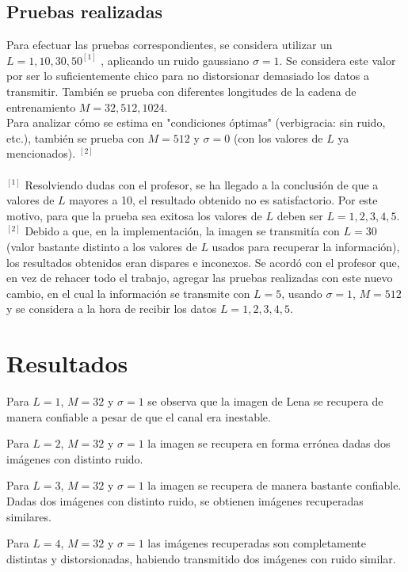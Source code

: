 \documentclass[10pt,journal,compsoc]{IEEEtran}
\begin{document}
\subsection{Pruebas realizadas}
Para efectuar las pruebas correspondientes, se considera utilizar un $L={1,10,30,50}^{[1]}$ , aplicando un ruido gaussiano $\sigma=1$. Se considera este valor por ser lo suficientemente chico para no distorsionar demasiado los datos a transmitir. Tambi\'en se prueba con diferentes longitudes de la cadena de entrenamiento $M={32,512,1024}$. \\  Para analizar c\'omo se estima en "condiciones \'optimas" (verbigracia: sin ruido, etc.), tambi\'en se prueba con $M=512$ y $\sigma=0$ (con los valores de $L$ ya mencionados). $^{[2]}$\\
\\
$^{[1]}$ Resolviendo dudas con el profesor, se ha llegado a la conclusi\'on de que a valores de $L$ mayores a 10, el resultado obtenido no es satisfactorio. Por este motivo, para que la prueba sea exitosa los valores de $L$ deben ser $L={1, 2, 3, 4, 5}$.\\
$^{[2]}$ Debido a que, en la implementaci\'on, la imagen se transmit\'ia con $L=30$ (valor bastante distinto a los valores de $L$ usados para recuperar la informaci\'on), los resultados obtenidos eran dispares e inconexos. Se acord\'o con el profesor que, en vez de rehacer todo el trabajo, agregar las pruebas realizadas con este nuevo cambio, en el cual la informaci\'on se transmite con $L=5$, usando $\sigma=1$, $M=512$ y se considera a la hora de recibir los datos $L={1, 2, 3, 4, 5}$. \\

\section{Resultados}

Para $L = {1}$, $M = {32}$ y $\sigma = 1$ se observa que la imagen de Lena se recupera de manera confiable a pesar de que el canal era inestable.


Para $L = {2}$, $M = {32}$ y $\sigma = 1$ la imagen se recupera en forma err\'onea dadas dos im\'agenes con distinto ruido.

Para $L = {3}$, $M = {32}$ y $\sigma = 1$ la imagen se recupera de manera bastante confiable. Dadas dos im\'agenes con distinto ruido, se obtienen im\'agenes recuperadas similares.

Para $L = {4}$, $M = {32}$ y $\sigma = 1$ las im\'agenes recuperadas son completamente distintas y distorsionadas, habiendo transmitido dos im\'agenes con ruido similar.
\end{document}
